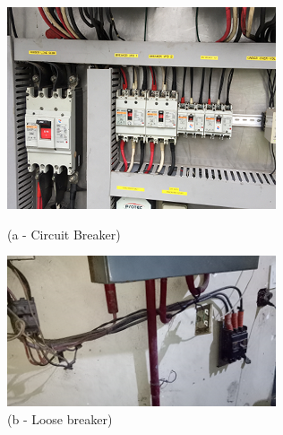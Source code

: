 \begin{figure}[!h]
	
	\begin{minipage}[b]{0.22\linewidth}
		\centering
		\includegraphics[width=\textwidth]{figures/fig_ch04_elecaudit_visualinspection_circuitbreaker}
		\caption*{(a - Circuit Breaker)}
	\end{minipage}
	\hspace{0.03cm}
	\begin{minipage}[b]{0.22\linewidth}
		\centering
		\includegraphics[width=\textwidth]{figures/fig_ch04_elecaudit_visualinspection_loosebreaker}
		\caption*{(b - Loose breaker)}


\end{minipage}
\end{figure}
